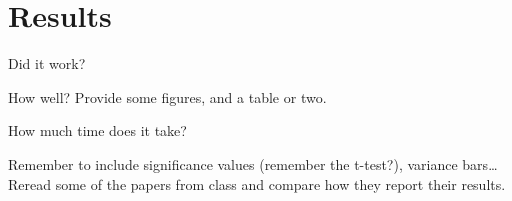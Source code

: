 \section{Results}
\label{05}
Did it work? 

How well? Provide some figures, and a table or two. 


How much time does it take?
%

Remember to include significance values (remember the t-test?), variance bars… Reread some of the papers from class and compare how they report their results.
